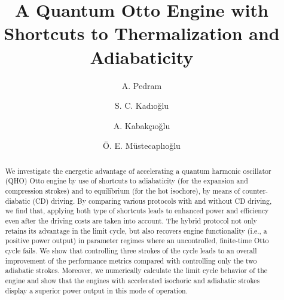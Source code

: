 \documentclass[aps,pra,twocolumn,showpacs,showkeys,groupedaddress,nobalancelastpage,nofootinbib,floatfix,superscriptaddress,longbibliography]{revtex4-2}
\begin{document}
\newcommand\be{\begin{equation}}
\newcommand\ee{\end{equation}}
\newcommand\bea{\begin{eqnarray}}
\newcommand\eea{\end{eqnarray}}
\newcommand\ket[1]{|#1\rangle}
\newcommand\bra[1]{\langle #1|}
\newcommand\braket[2]{\langle #1|#2\rangle}
\def\dbar{{\mathchar'26\mkern-12mu d}} %
 \newtheorem{thm}{Theorem}
 \newtheorem{cor}[thm]{Corollary}
 \newtheorem{lem}[thm]{Lemma}
 \newtheorem{prop}[thm]{Proposition}
 \newtheorem{defn}[thm]{Definition}
 \newtheorem{rem}[thm]{Remark}

\pagestyle{plain}
\title{\bf A Quantum Otto Engine with Shortcuts to Thermalization and Adiabaticity}
\author{ A. Pedram}
\author{ S. C. Kadıoğlu}
\author{A. Kabakçıoğlu}
\author{Ö. E. Müstecaplıoğlu}
\pagebreak

\begin{abstract}
  We investigate the energetic advantage of accelerating a quantum harmonic oscillator (QHO) Otto engine by use of shortcuts to adiabaticity (for the expansion and compression strokes) and to equilibrium (for the hot isochore), by means of counter-diabatic (CD) driving. By comparing various protocols with and without CD driving, we find that, applying both type of shortcuts leads to enhanced power and efficiency even after the driving costs are taken into account. The hybrid protocol not only retains its advantage in the limit cycle, but also recovers engine functionality (i.e., a positive power output) in parameter regimes where an uncontrolled, finite-time Otto cycle fails. We show that controlling three strokes of the cycle leads to an overall improvement of the performance metrics compared with controlling only the two adiabatic strokes. Moreover, we numerically calculate the limit cycle behavior of the engine and show that the engines with accelerated isochoric and adiabatic strokes display a superior power output in this mode of operation. 
\end{abstract}
\maketitle
\end{document}
